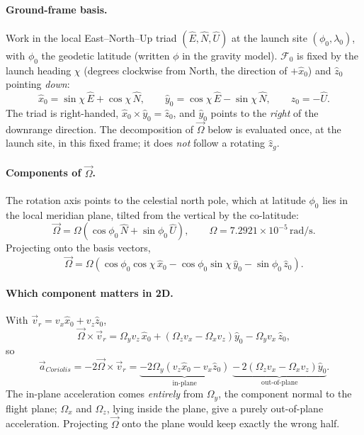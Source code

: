 \paragraph{Ground-frame basis.} Work in the local East--North--Up triad $(\hat{E},\hat{N},\hat{U})$
at the launch site $(\phi_0,\lambda_0)$, with $\phi_0$ the geodetic latitude (written $\phi$ in the
gravity model). $\mathcal{F}_0$ is fixed by the launch heading $\chi$ (degrees clockwise from
North, the direction of $+\hat{x}_0$) and $\hat{z}_0$ pointing \emph{down}:
\begin{equation}
    \hat{x}_0 = \sin\chi\,\hat{E} + \cos\chi\,\hat{N}, \qquad
    \hat{y}_0 = \cos\chi\,\hat{E} - \sin\chi\,\hat{N}, \qquad
    \hat{z}_0 = -\hat{U}.
\end{equation}
The triad is right-handed, $\hat{x}_0\times\hat{y}_0=\hat{z}_0$, and $\hat{y}_0$ points to the
\emph{right} of the downrange direction. The decomposition of $\vec{\Omega}$ below is evaluated
once, at the launch site, in this fixed frame; it does \emph{not} follow a rotating $\hat{z}_g$.

\paragraph{Components of $\vec{\Omega}$.} The rotation axis points to the celestial north pole,
which at latitude $\phi_0$ lies in the local meridian plane, tilted from the vertical by the
co-latitude:
\begin{equation}
    \vec{\Omega} = \Omega\left(\cos\phi_0\,\hat{N} + \sin\phi_0\,\hat{U}\right), \qquad
    \Omega = 7.2921\times10^{-5}\,\mathrm{rad/s}.
\end{equation}
Projecting onto the basis vectors,
\begin{equation} \label{eq:omega_components}
    \vec{\Omega} = \Omega\left(\cos\phi_0\cos\chi\,\hat{x}_0
        - \cos\phi_0\sin\chi\,\hat{y}_0 - \sin\phi_0\,\hat{z}_0\right).
\end{equation}

\paragraph{Which component matters in 2D.} With $\vec{v}_r=v_x\hat{x}_0+v_z\hat{z}_0$,
\begin{equation}
    \vec{\Omega}\times\vec{v}_r =
        \Omega_yv_z\,\hat{x}_0
        + \left(\Omega_zv_x - \Omega_xv_z\right)\hat{y}_0
        - \Omega_yv_x\,\hat{z}_0,
\end{equation}
so
\begin{equation} \label{eq:coriolis_split}
    \vec{a}_{Coriolis} = -2\vec{\Omega}\times\vec{v}_r =
        \underbrace{-2\Omega_y\left(v_z\hat{x}_0 - v_x\hat{z}_0\right)}_{\text{in-plane}}
        \;\underbrace{-\,2\left(\Omega_zv_x - \Omega_xv_z\right)\hat{y}_0}_{\text{out-of-plane}}.
\end{equation}
The in-plane acceleration comes \emph{entirely} from $\Omega_y$, the component normal to the
flight plane; $\Omega_x$ and $\Omega_z$, lying inside the plane, give a purely out-of-plane
acceleration. Projecting $\vec{\Omega}$ onto the plane would keep exactly the wrong half.

